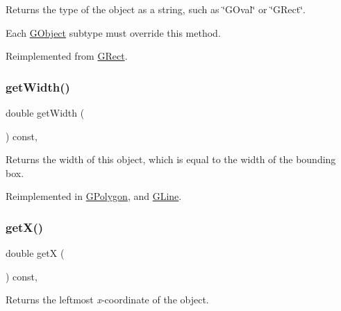 Returns the type of the object as a string, such as {\ttfamily \char`\"{}\+G\+Oval\char`\"{}} or {\ttfamily \char`\"{}\+G\+Rect\char`\"{}}. 

Each \mbox{\hyperlink{classsgl_1_1GObject}{G\+Object}} subtype must override this method. 

Reimplemented from \mbox{\hyperlink{classsgl_1_1GRect_a9b72ede4ee8520f987a0c01e30654814}{G\+Rect}}.

\mbox{\label{classsgl_1_1GObject_a0ed2965abd4f5701d2cadf71239faf19}} 
\subsubsection{\texorpdfstring{get\+Width()}{getWidth()}}
{\footnotesize\ttfamily double get\+Width (\begin{DoxyParamCaption}{ }\end{DoxyParamCaption}) const\hspace{0.3cm}{\ttfamily [virtual]}, {\ttfamily [inherited]}}



Returns the width of this object, which is equal to the width of the bounding box. 



Reimplemented in \mbox{\hyperlink{classsgl_1_1GPolygon_ab7b172cec7ed45e1246a3ce3160a62f7}{G\+Polygon}}, and \mbox{\hyperlink{classsgl_1_1GLine_ab7b172cec7ed45e1246a3ce3160a62f7}{G\+Line}}.

\mbox{\label{classsgl_1_1GObject_a344385751bee0720059403940d57a13e}} 
\subsubsection{\texorpdfstring{get\+X()}{getX()}}
{\footnotesize\ttfamily double getX (\begin{DoxyParamCaption}{ }\end{DoxyParamCaption}) const\hspace{0.3cm}{\ttfamily [virtual]}, {\ttfamily [inherited]}}



Returns the leftmost {\itshape x}-\/coordinate of the object. 

